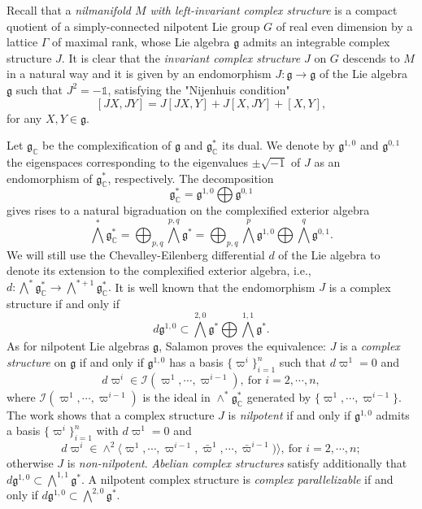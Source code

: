 \documentclass[12pt]{amsart}
\numberwithin{equation}{section}
\renewcommand{\1}{\mathds{1}}
\renewcommand{\>}{\rightarrow}
\begin{document}
Recall that a \emph{nilmanifold $M$ with left-invariant complex
structure} is a compact quotient of a simply-connected nilpotent Lie
group $G$ of real even dimension by a lattice $\Gamma$ of maximal
rank, whose Lie algebra $\mathfrak{g}$ admits an integrable complex
structure $J$. It is clear that the \emph{invariant complex
structure} $J$ on $G$ descends to $M$ in a natural way and it is
given by an endomorphism $J:\mathfrak{g}\rightarrow \mathfrak{g}$ of
the Lie algebra $\mathfrak{g}$ such that $J^2=-\1$, satisfying the
"Nijenhuis condition"
 $$[JX,JY]=J[JX,Y]+J[X,JY]+[X,Y],$$
for any $X,Y\in \mathfrak{g}$.%

Let $\mathfrak{g}_\mathbb{C}$ be the complexification of
$\mathfrak{g}$ and $\mathfrak{g}_\mathbb{C}^*$ its dual.
We denote by $\mathfrak{g}^{1,0}$ and $\mathfrak{g}^{0,1}$ the
eigenspaces corresponding to the eigenvalues $\pm\sqrt{-1}$ of $J$
as an endomorphism of $\mathfrak{g}_\mathbb{C}^*$, respectively. The
decomposition
$$\mathfrak{g}_\mathbb{C}^*=\mathfrak{g}^{1,0}\bigoplus\mathfrak{g}^{0,1}$$
gives rises to a natural bigraduation on the complexified exterior
algebra
$$\bigwedge^*\mathfrak{g}_\mathbb{C}^*=\bigoplus_{p,q}\bigwedge^{p,q}
\mathfrak{g}^* =\bigoplus_{p,q}\bigwedge^p
\mathfrak{g}^{1,0}\bigoplus\bigwedge^q\mathfrak{g}^{0,1}.$$ We will
still use the Chevalley-Eilenberg differential $d$ of the Lie
algebra to denote its extension to the complexified exterior
algebra, i.e.,
$d:\bigwedge^*\mathfrak{g}_\mathbb{C}^*\rightarrow\bigwedge^{*+1}\mathfrak{g}_\mathbb{C}^*.$
It is well known that the endomorphism $J$ is a complex structure if
and only if \[d\mathfrak{g}^{1,0}\subset\bigwedge^{2,0}
\mathfrak{g}^*\bigoplus\bigwedge^{1,1} \mathfrak{g}^*.\] As for
nilpotent Lie algebras $\mathfrak{g}$, Salamon \cite{Sa} proves the
equivalence: $J$ is a \emph{complex structure} on $\mathfrak{g}$ if
and only if $\mathfrak{g}^{1,0}$ has a basis $\{\varpi^i\}_{i=1}^n$
such that $d\varpi^1=0$ and
$$d\varpi^i\in \mathcal{I}(\varpi^1,\cdots,\varpi^{i-1}),\ \text{for $i=2,\cdots,n$},$$
where $\mathcal{I}(\varpi^1,\cdots,\varpi^{i-1})$ is the ideal in
$\wedge^*\mathfrak{g}_\mathbb{C}^*$ generated by
$\{\varpi^1,\cdots,\varpi^{i-1}\}$. The work \cite{CFGU} shows that
a complex structure $J$ is\emph{ nilpotent} if and only if
$\mathfrak{g}^{1,0}$ admits a basis $\{\varpi^i\}_{i=1}^n$ with
$d\varpi^1=0$ and
$$d\varpi^i\in \wedge^2\langle\varpi^1,\cdots,\varpi^{i-1},\bar{\varpi}^1,\cdots,\bar{\varpi}^{i-1})\rangle,\ \text{for $i=2,\cdots,n$};$$
otherwise $J$ is \emph{non-nilpotent}. \emph{Abelian complex
structures} satisfy additionally that $d\mathfrak{g}^{1,0}\subset
\bigwedge^{1,1} \mathfrak{g}^*$. A nilpotent complex structure is
\emph{complex parallelizable} if and only if
$d\mathfrak{g}^{1,0}\subset \bigwedge^{2,0} \mathfrak{g}^*$.
\end{document}

